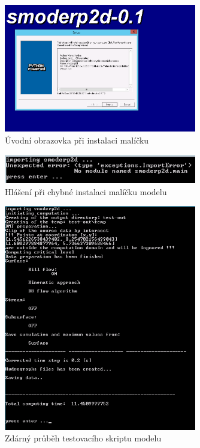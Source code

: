   \begin{figure}[b!]
    \centering
    \includegraphics[width=0.75\textwidth]{./img/instalace.png}
    \caption{Úvodní obrazovka při instalaci malíčku \smod}
    \label{fig:pruvodce}
  \end{figure}
% 
  \begin{figure}[b!]
    \centering
    \includegraphics[width=0.75\textwidth]{./img/importerror.png}
    \caption{Hlášení při chybné instalaci malíčku modelu \smod}
    \label{fig:importerror}
  \end{figure}
% 
  \begin{figure}
    \centering
    \includegraphics[width=0.75\textwidth]{./img/testok.png}
    \caption{Zdárný průběh testovacího skriptu modelu}
    \label{fig:testok}
  \end{figure}
  
